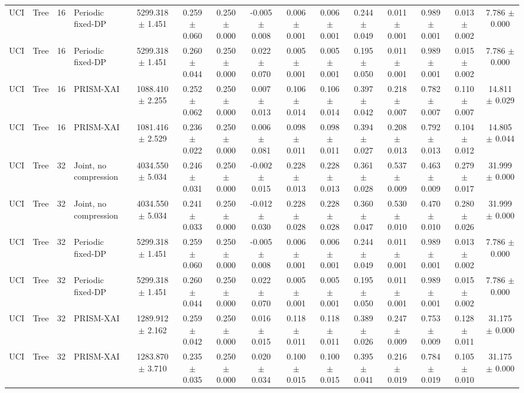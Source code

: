 \begin{tabular}{llllccccccccccc}
UCI & Tree & 16 & Periodic fixed-DP & 5299.318 $\pm$ 1.451 & 0.259 $\pm$ 0.060 & 0.250 $\pm$ 0.000 & -0.005 $\pm$ 0.008 & 0.006 $\pm$ 0.001 & 0.006 $\pm$ 0.001 & 0.244 $\pm$ 0.049 & 0.011 $\pm$ 0.001 & 0.989 $\pm$ 0.001 & 0.013 $\pm$ 0.002 & 7.786 $\pm$ 0.000 \\
UCI & Tree & 16 & Periodic fixed-DP & 5299.318 $\pm$ 1.451 & 0.260 $\pm$ 0.044 & 0.250 $\pm$ 0.000 & 0.022 $\pm$ 0.070 & 0.005 $\pm$ 0.001 & 0.005 $\pm$ 0.001 & 0.195 $\pm$ 0.050 & 0.011 $\pm$ 0.001 & 0.989 $\pm$ 0.001 & 0.015 $\pm$ 0.002 & 7.786 $\pm$ 0.000 \\
UCI & Tree & 16 & PRISM-XAI & 1088.410 $\pm$ 2.255 & 0.252 $\pm$ 0.062 & 0.250 $\pm$ 0.000 & 0.007 $\pm$ 0.013 & 0.106 $\pm$ 0.014 & 0.106 $\pm$ 0.014 & 0.397 $\pm$ 0.042 & 0.218 $\pm$ 0.007 & 0.782 $\pm$ 0.007 & 0.110 $\pm$ 0.007 & 14.811 $\pm$ 0.029 \\
UCI & Tree & 16 & PRISM-XAI & 1081.416 $\pm$ 2.529 & 0.236 $\pm$ 0.022 & 0.250 $\pm$ 0.000 & 0.006 $\pm$ 0.081 & 0.098 $\pm$ 0.011 & 0.098 $\pm$ 0.011 & 0.394 $\pm$ 0.027 & 0.208 $\pm$ 0.013 & 0.792 $\pm$ 0.013 & 0.104 $\pm$ 0.012 & 14.805 $\pm$ 0.044 \\
UCI & Tree & 32 & Joint, no compression & 4034.550 $\pm$ 5.034 & 0.246 $\pm$ 0.031 & 0.250 $\pm$ 0.000 & -0.002 $\pm$ 0.015 & 0.228 $\pm$ 0.013 & 0.228 $\pm$ 0.013 & 0.361 $\pm$ 0.028 & 0.537 $\pm$ 0.009 & 0.463 $\pm$ 0.009 & 0.279 $\pm$ 0.017 & 31.999 $\pm$ 0.000 \\
UCI & Tree & 32 & Joint, no compression & 4034.550 $\pm$ 5.034 & 0.241 $\pm$ 0.033 & 0.250 $\pm$ 0.000 & -0.012 $\pm$ 0.030 & 0.228 $\pm$ 0.028 & 0.228 $\pm$ 0.028 & 0.360 $\pm$ 0.047 & 0.530 $\pm$ 0.010 & 0.470 $\pm$ 0.010 & 0.280 $\pm$ 0.026 & 31.999 $\pm$ 0.000 \\
UCI & Tree & 32 & Periodic fixed-DP & 5299.318 $\pm$ 1.451 & 0.259 $\pm$ 0.060 & 0.250 $\pm$ 0.000 & -0.005 $\pm$ 0.008 & 0.006 $\pm$ 0.001 & 0.006 $\pm$ 0.001 & 0.244 $\pm$ 0.049 & 0.011 $\pm$ 0.001 & 0.989 $\pm$ 0.001 & 0.013 $\pm$ 0.002 & 7.786 $\pm$ 0.000 \\
UCI & Tree & 32 & Periodic fixed-DP & 5299.318 $\pm$ 1.451 & 0.260 $\pm$ 0.044 & 0.250 $\pm$ 0.000 & 0.022 $\pm$ 0.070 & 0.005 $\pm$ 0.001 & 0.005 $\pm$ 0.001 & 0.195 $\pm$ 0.050 & 0.011 $\pm$ 0.001 & 0.989 $\pm$ 0.001 & 0.015 $\pm$ 0.002 & 7.786 $\pm$ 0.000 \\
UCI & Tree & 32 & PRISM-XAI & 1289.912 $\pm$ 2.162 & 0.259 $\pm$ 0.042 & 0.250 $\pm$ 0.000 & 0.016 $\pm$ 0.015 & 0.118 $\pm$ 0.011 & 0.118 $\pm$ 0.011 & 0.389 $\pm$ 0.026 & 0.247 $\pm$ 0.009 & 0.753 $\pm$ 0.009 & 0.128 $\pm$ 0.011 & 31.175 $\pm$ 0.000 \\
UCI & Tree & 32 & PRISM-XAI & 1283.870 $\pm$ 3.710 & 0.235 $\pm$ 0.035 & 0.250 $\pm$ 0.000 & 0.020 $\pm$ 0.034 & 0.100 $\pm$ 0.015 & 0.100 $\pm$ 0.015 & 0.395 $\pm$ 0.041 & 0.216 $\pm$ 0.019 & 0.784 $\pm$ 0.019 & 0.105 $\pm$ 0.010 & 31.175 $\pm$ 0.000 \\
\bottomrule
\end{tabular}
